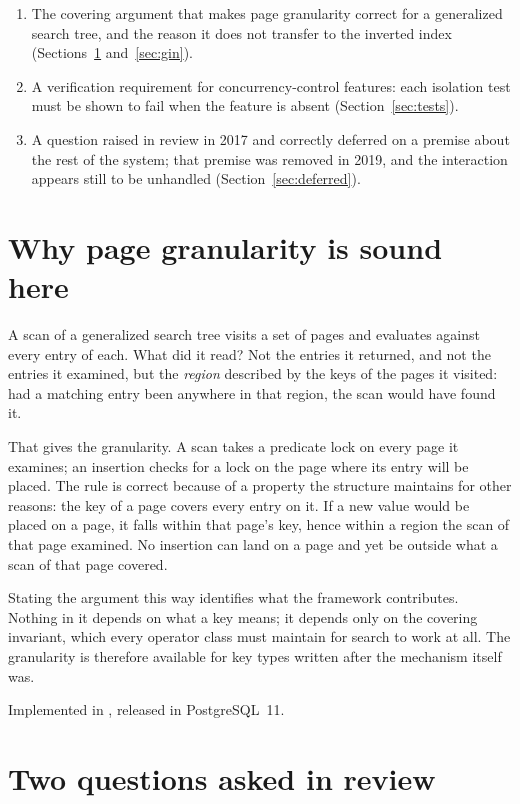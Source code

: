 \begin{enumerate}
\item The covering argument that makes page granularity correct for a
      generalized search tree, and the reason it does not transfer to the
      inverted index (Sections~\ref{sec:gist} and~\ref{sec:gin}).
\item A verification requirement for concurrency-control features: each
      isolation test must be shown to fail when the feature is absent
      (Section~\ref{sec:tests}).
\item A question raised in review in 2017 and correctly deferred on a premise
      about the rest of the system; that premise was removed in 2019, and the
      interaction appears still to be unhandled (Section~\ref{sec:deferred}).
\end{enumerate}

\section{Why page granularity is sound here}
\label{sec:gist}

A scan of a generalized search tree visits a set of pages and evaluates
 against every entry of each. What did it read? Not the entries
it returned, and not the entries it examined, but the \emph{region} described by
the keys of the pages it visited: had a matching entry been anywhere in that
region, the scan would have found it.

That gives the granularity. A scan takes a predicate lock on every page it
examines; an insertion checks for a lock on the page where its entry will be
placed. The rule is correct because of a property the structure maintains for
other reasons: the key of a page covers every entry on it. If a new value would be
placed on a page, it falls within that page's key, hence within a region the scan
of that page examined. No insertion can land on a page and yet be outside what a
scan of that page covered.

Stating the argument this way identifies what the framework contributes. Nothing
in it depends on what a key means; it depends only on the covering invariant,
which every operator class must maintain for search to work at all. The
granularity is therefore available for key types written after the mechanism
itself was.

Implemented in , released in PostgreSQL~11.

\section{Two questions asked in review}
\label{sec:questions}

